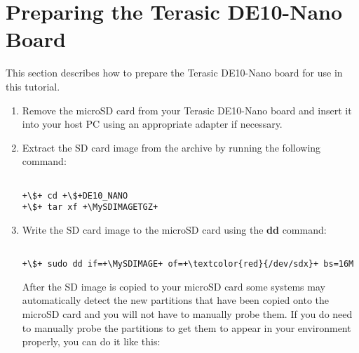 \section*{Preparing the Terasic DE10-Nano Board}

\begin{flushleft}
\noindent

This section describes how to prepare the Terasic DE10-Nano board for use in this tutorial.

\begin{enumerate}[
	label=\textbf{Step \arabic*.},
	leftmargin=*,
	widest={00},
	align=left]

\item Remove the microSD card from your Terasic DE10-Nano board and insert it into your host PC using an appropriate adapter if necessary.

\newpage

\item Extract the SD card image from the archive by running the following command:

\begin{verbatim}

+\$+ cd +\$+DE10_NANO
+\$+ tar xf +\MySDIMAGETGZ+

\end{verbatim}

\item Write the SD card image to the microSD card using the \textbf{dd} command:

\begin{verbatim}

+\$+ sudo dd if=+\MySDIMAGE+ of=+\textcolor{red}{/dev/sdx}+ bs=16M

\end{verbatim}

After the SD image is copied to your microSD card some systems may automatically detect the new partitions that have been copied onto the microSD card and you will not have to manually probe them.  If you do need to manually probe the partitions to get them to appear in your environment properly, you can do it like this:

\begin{verbatim}


\end{verbatim}
\end{enumerate}
\end{flushleft}
